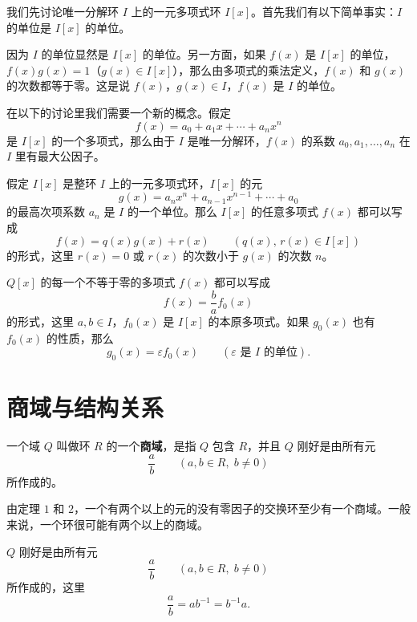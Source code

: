 \begin{note}[一元多项式环基础知识]
我们先讨论唯一分解环 $I$ 上的一元多项式环 $I[x]$。首先我们有以下简单事实：$I$ 的单位是 $I[x]$ 的单位。

因为 $I$ 的单位显然是 $I[x]$ 的单位。另一方面，如果 $f(x)$ 是 $I[x]$ 的单位，$f(x)g(x)=1$（$g(x)\in I[x]$），那么由多项式的乘法定义，$f(x)$ 和 $g(x)$ 的次数都等于零。这是说 $f(x)$，$g(x)\in I$，$f(x)$ 是 $I$ 的单位。

在以下的讨论里我们需要一个新的概念。假定
\[
f(x)=a_0+a_1x+\cdots+a_nx^n
\]
是 $I[x]$ 的一个多项式，那么由于 $I$ 是唯一分解环，$f(x)$ 的系数 $a_0,a_1,\ldots,a_n$ 在 $I$ 里有最大公因子。
\end{note}

\begin{lemma}[带余除法引理]
假定 $I[x]$ 是整环 $I$ 上的一元多项式环，$I[x]$ 的元
\[
g(x)=a_nx^n+a_{n-1}x^{n-1}+\cdots+a_0
\]
的最高次项系数 $a_n$ 是 $I$ 的一个单位。那么 $I[x]$ 的任意多项式 $f(x)$ 都可以写成
\[
f(x)=q(x)g(x)+r(x)\qquad(q(x),\,r(x)\in I[x])
\]
的形式，这里 $r(x)=0$ 或 $r(x)$ 的次数小于 $g(x)$ 的次数 $n$。
\end{lemma}

\begin{lemma}[引理 2：有理系数多项式的标准化]
$Q[x]$ 的每一个不等于零的多项式 $f(x)$ 都可以写成
\[
f(x)=\frac{b}{a}f_0(x)
\]
的形式，这里 $a,b\in I$，$f_0(x)$ 是 $I[x]$ 的本原多项式。如果 $g_0(x)$ 也有 $f_0(x)$ 的性质，那么
\[
g_0(x)=\varepsilon f_0(x)\qquad(\varepsilon\text{ 是 }I\text{ 的单位}).
\]
\end{lemma}

\section{商域与结构关系}

\begin{definition}[商域]
一个域 $Q$ 叫做环 $R$ 的一个\textbf{商域}，是指 $Q$ 包含 $R$，并且 $Q$ 刚好是由所有元
\[
\frac{a}{b}\qquad(a,b\in R,\;b\ne 0)
\]
所作成的。

由定理 $1$ 和 $2$，一个有两个以上的元的没有零因子的交换环至少有一个商域。一般来说，一个环很可能有两个以上的商域。
\end{definition}

\begin{theorem}[定理 2：商域的元素结构]
$Q$ 刚好是由所有元
\[
\frac{a}{b}\qquad(a,b\in R,\;b\ne 0)
\]
所作成的，这里
\[
\frac{a}{b}=ab^{-1}=b^{-1}a.
\]
\end{theorem}

